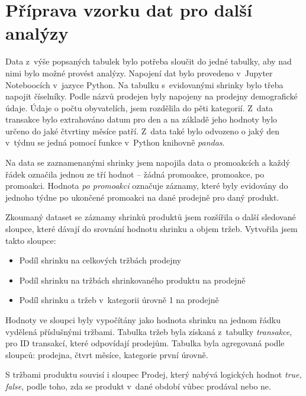 \section{Příprava vzorku dat pro další analýzy}
\label{sec:priprava}
Data z~výše popsaných tabulek bylo potřeba sloučit do jedné tabulky, aby nad nimi bylo možné provést analýzy. Napojení dat bylo provedeno v~Jupyter Noteboocích v~jazyce Python. Na tabulku s~evidovanými shrinky bylo třeba napojit číselníky. Podle názvů prodejen byly napojeny na prodejny demografické údaje. Údaje o počtu obyvatelích, jsem rozdělila do pěti kategorií. Z~data transakce bylo extrahováno datum pro den a na základě jeho hodnoty bylo určeno do jaké čtvrtiny měsíce patří. Z~data také bylo odvozeno o jaký den v~týdnu se jedná pomocí funkce v~Python knihovně \emph{pandas}.

Na data se zaznamenanými shrinky jsem napojila data o promoakcích a každý řádek označila jednou ze tří hodnot -- žádná promoakce, promoakce, po promoakci. Hodnota \emph{po promoakci} označuje záznamy, které byly evidovány do jednoho týdne po ukončené promoakci na dané prodejně pro daný produkt. 


Zkoumaný dataset se záznamy shrinků produktů jsem rozšířila o další sledované sloupce, které dávají do srovnání hodnotu shrinku a objem tržeb. Vytvořila jsem takto sloupce: 
\begin{itemize}
    \itemsep 0em
    \item Podíl shrinku na celkových tržbách prodejny
    \item Podíl shrinku na tržbách shrinkovaného produktu na prodejně
    \item Podíl shrinku a tržeb v~kategorii úrovně 1 na prodejně
\end{itemize}

Hodnoty ve sloupci byly vypočítány jako hodnota shrinku na jednom řádku vydělená příslušnými tržbami. 
    Tabulka tržeb byla získaná z~tabulky \emph{transakce}, pro ID transakcí, které odpovídají prodejům. Tabulka byla agregovaná podle sloupců: prodejna, čtvrt měsíce, kategorie první úrovně.

S tržbami produktu souvisí i sloupec Prodej, který nabývá logických hodnot \emph{true, false}, podle toho, zda se produkt v~dané období vůbec prodával nebo ne.


